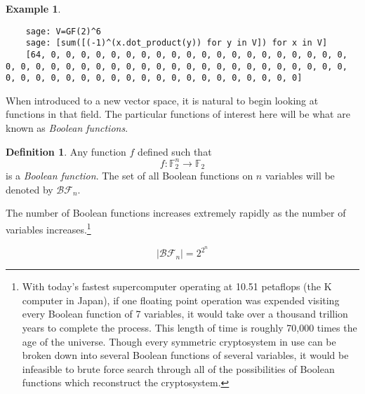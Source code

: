\documentclass[english]{article}
\def\gftwo{\mathbb{F}_2}
\def\BF{\mathcal{BF}}
\theoremstyle{plain}
\theoremstyle{definition}
\newtheorem{definition}[theorem]{Definition}%
\newtheorem{example}[theorem]{Example}
\theoremstyle{remark}
\begin{document}
\begin{example}
  \ 
  \begin{lstlisting}
    sage: V=GF(2)^6
    sage: [sum([(-1)^(x.dot_product(y)) for y in V]) for x in V]
    [64, 0, 0, 0, 0, 0, 0, 0, 0, 0, 0, 0, 0, 0, 0, 0, 0, 0, 0, 0, 0, 0, 0, 0, 0, 0, 0, 0, 0, 0, 0, 0, 0, 0, 0, 0, 0, 0, 0, 0, 0, 0, 0, 0, 0, 0, 0, 0, 0, 0, 0, 0, 0, 0, 0, 0, 0, 0, 0, 0, 0, 0, 0, 0]
  \end{lstlisting}
\end{example}

\par When introduced to a new vector space, it is natural to begin looking
at functions in that field. The particular functions of interest here will
be what are known as {\em Boolean functions}.

\begin{definition}
\label{def:boolean-function}
  Any function $f$ defined such that 
  \begin{equation*}
    f:\gftwo^n\rightarrow\gftwo
  \end{equation*}
  is a {\em Boolean function}. The set of all Boolean functions on $n$
  variables will be denoted by $\BF_n$.
\end{definition}

\par The number of Boolean functions increases extremely rapidly as the
number of variables increases.\footnote{With today's fastest supercomputer
operating at 10.51 petaflops (the K computer in Japan), if one floating
point operation was expended visiting every Boolean function of 7 variables,
it would take over a thousand trillion years to complete the process. This
length of time is roughly 70,000 times the age of the universe. Though
every symmetric cryptosystem in use can be broken down into several Boolean
functions of several variables, it would be infeasible to brute force search
through all of the possibilities of Boolean functions which reconstruct the
cryptosystem.}

\begin{equation}
  \lvert\BF_n\rvert = 2^{2^n}
\end{equation}
\end{document}
